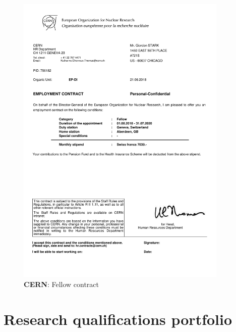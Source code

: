 \begin{figure}[h!]
	\centering
	\caption{\textbf{CERN}: Fellow contract}
	\includegraphics[width=0.9\textwidth]{attachments/B-CV/cernFellowContract.pdf}
\end{figure}

\setcounter{chapter}{3}
\chapter{Research qualifications portfolio}

